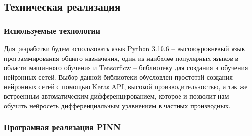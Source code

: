 \documentclass[a4paper,14pt]{extarticle} %
\begin{document}
\FloatBarrier
\subsection{Техническая реализация}
\subsubsection{Используемые технологии}


Для разработки будем использовать язык Python 3.10.6 -- высокоуровневый язык программирования общего назначения, один из наиболее популярных языков в области машинного обучения и Tensorflow -- библиотеку для создания и обучения нейронных сетей. Выбор данной библиотеки обусловлен простотой создания нейронных сетей с помощью Keras API, высокой производительностью, а так же встроенным автоматическим дифференцированием, которое и позволит нам обучить нейросеть дифференциальным уравнениям в частных производных.

\subsubsection{Програмная реализация PINN}

\end{document}

